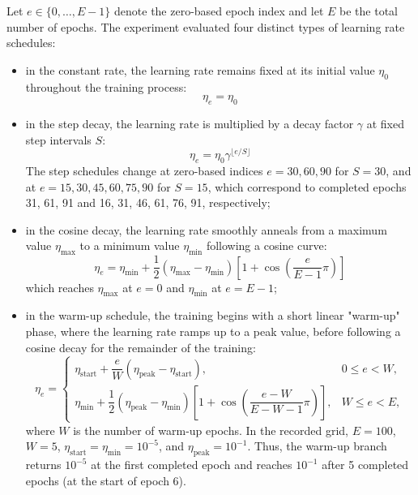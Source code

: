 Let $e\in\{0,\ldots,E-1\}$ denote the zero-based epoch index and let $E$ be the total number of epochs. The experiment evaluated four distinct types of learning rate schedules:
\begin{itemize}
    \item[-] in the constant rate, the learning rate remains fixed at its initial value $\eta_0$ throughout the training process:
    \begin{equation*}
    \eta_e=\eta_0
    \end{equation*}
    \item[-] in the step decay, the learning rate is multiplied by a decay factor $\gamma$ at fixed step intervals $S$:
    \begin{equation*}
    \eta_e=\eta_0\gamma^{\lfloor e/S\rfloor}
    \end{equation*}
    The step schedules change at zero-based indices $e=30,60,90$ for $S=30$, and at $e=15,30,45,60,75,90$ for $S=15$, which correspond to completed epochs 31, 61, 91 and 16, 31, 46, 61, 76, 91, respectively;
    \item[-] in the cosine decay, the learning rate smoothly anneals from a maximum value $\eta_{\max}$ to a minimum value $\eta_{\min}$ following a cosine curve:
    \begin{equation*}
    \eta_e=\eta_{\min}+\frac{1}{2}(\eta_{\max}-\eta_{\min})
    \left[1+\cos\left(\frac{e}{E-1}\pi\right)\right]
    \end{equation*}
    which reaches $\eta_{\max}$ at $e=0$ and $\eta_{\min}$ at $e=E-1$;
    \item[-] in the warm-up schedule, the training begins with a short linear "warm-up" phase, where the learning rate ramps up to a peak value, before following a cosine decay for the remainder of the training:
    \begin{equation*}
    \eta_e=\begin{cases}
        \eta_{\mathrm{start}}+\dfrac{e}{W}
        (\eta_{\mathrm{peak}}-\eta_{\mathrm{start}}), & 0\leq e<W,\\[6pt]
        \eta_{\min}+\dfrac{1}{2}(\eta_{\mathrm{peak}}-\eta_{\min})
        \left[1+\cos\left(\dfrac{e-W}{E-W-1}\pi\right)\right], & W\leq e<E,
    \end{cases}
    \end{equation*}
    where $W$ is the number of warm-up epochs. In the recorded grid, $E=100$, $W=5$, $\eta_{\mathrm{start}}=\eta_{\min}=10^{-5}$, and $\eta_{\mathrm{peak}}=10^{-1}$. Thus, the warm-up branch returns $10^{-5}$ at the first completed epoch and reaches $10^{-1}$ after 5 completed epochs (at the start of epoch 6).
\end{itemize}
\vspace{2ex}

